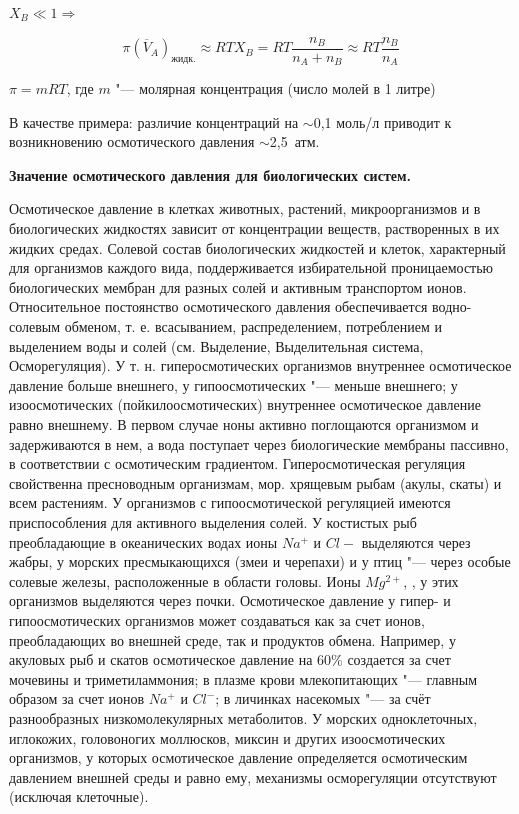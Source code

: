 \documentclass[12pt,a4paper,oneside]{book}
\begin{document}
$X_B \ll 1 \Rightarrow$

\begin{equation}
	\pi (\overline{V}_A)_\text {жидк.} \approx RT X_B = RT \frac {n_B} {n_A+n_B} \approx RT \frac {n_B} {n_A}
\end{equation}

$\pi = mRT$, где $m$ "--- молярная концентрация (число молей в 1 литре)

В качестве примера: различие концентраций на $\sim$0,1 моль/л приводит к возникновению осмотического давления $\sim$2,5~атм.

\textbf{Значение осмотического давления для биологических систем.}

Осмотическое давление в клетках животных, растений, микроорганизмов и в биологических жидкостях зависит от концентрации веществ, растворенных в их жидких средах. Солевой состав биологических жидкостей и клеток, характерный для организмов каждого вида, поддерживается избирательной проницаемостью биологических мембран для разных солей и активным транспортом ионов. Относительное постоянство осмотического давления обеспечивается водно-солевым обменом, т. е. всасыванием, распределением, потреблением и выделением воды и солей (см. Выделение, Выделительная система, Осморегуляция). У т. н. гиперосмотических организмов внутреннее осмотическое давление больше внешнего, у гипоосмотических "--- меньше внешнего; у изоосмотических (пойкилоосмотических) внутреннее осмотическое давление равно внешнему. В первом случае ноны активно поглощаются организмом и задерживаются в нем, а вода поступает через биологические мембраны пассивно, в соответствии с осмотическим градиентом. Гиперосмотическая регуляция свойственна пресноводным организмам, мор. хрящевым рыбам (акулы, скаты) и всем растениям. У организмов с гипоосмотической регуляцией имеются приспособления для активного выделения солей. У костистых рыб преобладающие в океанических водах ионы $Na^+$ и $Cl-$ выделяются через жабры, у морских пресмыкающихся (змеи и черепахи) и у птиц "--- через особые солевые железы, расположенные в области головы. Ионы $Mg^{2+}$, , у этих организмов выделяются через почки. Осмотическое давление у гипер- и гипоосмотических организмов может создаваться как за счет ионов, преобладающих во внешней среде, так и продуктов обмена. Например, у акуловых рыб и скатов осмотическое давление на 60\% создается за счет мочевины и триметиламмония; в плазме крови млекопитающих "--- главным образом за счет ионов $Na^+$ и $Cl^-$; в личинках насекомых "--- за счёт разнообразных низкомолекулярных метаболитов. У морских одноклеточных, иглокожих, головоногих моллюсков, миксин и других изоосмотических организмов, у которых осмотическое давление определяется осмотическим давлением внешней среды и равно ему, механизмы осморегуляции отсутствуют (исключая клеточные).
\end{document}

